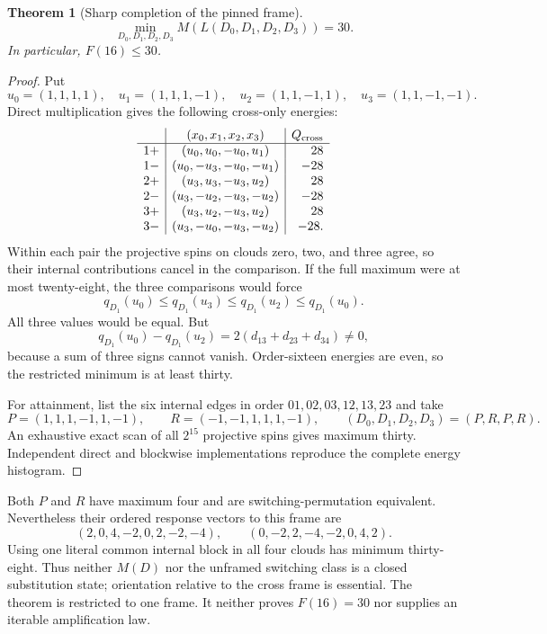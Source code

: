 \documentclass[11pt]{article}
\newtheorem{theorem}{Theorem}[section]
\theoremstyle{remark}
\begin{document}
\begin{theorem}[Sharp completion of the pinned frame]
\begin{equation}
 \min_{D_0,D_1,D_2,D_3}M(L(D_0,D_1,D_2,D_3))=30.          \label{eq:frame30}
\end{equation}
In particular, $F(16)\le30$.
\end{theorem}

\begin{proof}
Put
\[
u_0=(1,1,1,1),\quad u_1=(1,1,1,-1),\quad
u_2=(1,1,-1,1),\quad u_3=(1,1,-1,-1).
\]
Direct multiplication gives the following cross-only energies:
\[
\begin{array}{c|c|r}
& (x_0,x_1,x_2,x_3)&Q_{\rm cross}\\ \hline
1+&(u_0,u_0,-u_0,u_1)&28\\
1-&(u_0,-u_3,-u_0,-u_1)&-28\\
2+&(u_3,u_3,-u_3,u_2)&28\\
2-&(u_3,-u_2,-u_3,-u_2)&-28\\
3+&(u_3,u_2,-u_3,u_2)&28\\
3-&(u_3,-u_0,-u_3,-u_2)&-28.
\end{array}
\]
Within each pair the projective spins on clouds zero, two, and three agree,
so their internal contributions cancel in the comparison.  If the full
maximum were at most twenty-eight, the three comparisons would force
\[
 q_{D_1}(u_0)\le q_{D_1}(u_3)\le q_{D_1}(u_2)
 \le q_{D_1}(u_0).
\]
All three values would be equal.  But
\[
 q_{D_1}(u_0)-q_{D_1}(u_2)
 =2(d_{13}+d_{23}+d_{34})\ne0,
\]
because a sum of three signs cannot vanish.  Order-sixteen energies are even,
so the restricted minimum is at least thirty.

For attainment, list the six internal edges in order
$01,02,03,12,13,23$ and take
\[
 P=(1,1,1,-1,1,-1),\qquad
 R=(-1,-1,1,1,1,-1),\qquad
 (D_0,D_1,D_2,D_3)=(P,R,P,R).
\]
An exhaustive exact scan of all $2^{15}$ projective spins gives maximum
thirty.  Independent direct and blockwise implementations reproduce the
complete energy histogram.
\end{proof}

Both $P$ and $R$ have maximum four and are switching-permutation equivalent.
Nevertheless their ordered response vectors to this frame are
\[
 (2,0,4,-2,0,2,-2,-4),\qquad
 (0,-2,2,-4,-2,0,4,2).
\]
Using one literal common internal block in all four clouds has minimum
thirty-eight.  Thus neither $M(D)$ nor the unframed switching class is a
closed substitution state; orientation relative to the cross frame is
essential.  The theorem is restricted to one frame.  It neither proves
$F(16)=30$ nor supplies an iterable amplification law.
\end{document}
